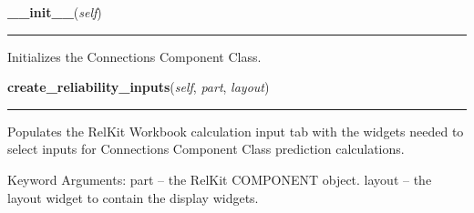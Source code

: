 \hspace{.8\funcindent}\begin{boxedminipage}{\funcwidth}

    \raggedright \textbf{\_\_init\_\_}(\textit{self})

    \vspace{-1.5ex}

    \rule{\textwidth}{0.5\fboxrule}
\setlength{\parskip}{2ex}
    Initializes the Connections Component Class.

\setlength{\parskip}{1ex}
    \end{boxedminipage}

    \label{reliafree:connections:connection:Connection:create_reliability_inputs}

    \vspace{0.5ex}

\hspace{.8\funcindent}\begin{boxedminipage}{\funcwidth}

    \raggedright \textbf{create\_reliability\_inputs}(\textit{self}, \textit{part}, \textit{layout})

    \vspace{-1.5ex}

    \rule{\textwidth}{0.5\fboxrule}
\setlength{\parskip}{2ex}
    Populates the RelKit Workbook calculation input tab with the widgets
    needed to select inputs for Connections Component Class prediction 
    calculations.

    Keyword Arguments: part   -- the RelKit COMPONENT object. layout -- 
    the layout widget to contain the display widgets.

\setlength{\parskip}{1ex}
    \end{boxedminipage}

    \label{reliafree:connections:connection:Connection:create_reliability_outputs}

    \vspace{0.5ex}

